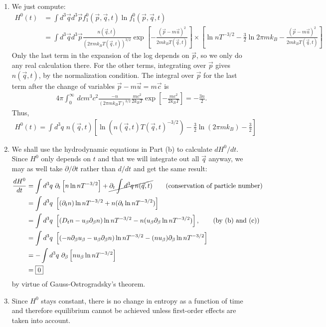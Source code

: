 \documentclass{article}
\theoremstyle{definition}
\newcommand{\p}{\partial}
\newcommand{\be}{\beta}
\newcommand{\f}[2]{\frac{#1}{#2}}
\newcommand{\lp}{\left(}
\newcommand{\rp}{\right)}
\newcommand{\lb}{\left[}
\newcommand{\rb}{\right]}
\begin{document}
\begin{enumerate}[label=(\alph*)]
	
	\item  We just compute:
	\begin{align*}
	H^0(t) 
	&= \int d^3\vec{q} d^3\vec{p} f_1^0 (\vec{p},\vec{q},t) \ln  f_1^0 (\vec{p},\vec{q},t) \\
	&= \int d^3\vec{q} d^3\vec{p} \f{n(\vec{q},t)}{(2\pi m k_BT (\vec{q},t))^{3/2}} \exp\lb -\f{(\vec{p} - m\vec{u})^2}{2mk_BT(\vec{q},t)} \rb\times\lb \ln nT^{-3/2}-\f{3}{2}\ln 2\pi m k_B - \f{(\vec{p} - m\vec{u})^2}{2mk_B T(\vec{q},t)}\rb
	\end{align*}
	Only the last term in the expansion of the log depends on $\vec{p}$, so we only do any real calculation there. For the other terms, integrating over $\vec{p}$ gives $n(\vec{q},t)$, by the normalization condition. The integral over $\vec{p}$ for the last term after the change of variables $\vec{p} - m\vec{u} = m\vec{c}$ is 
	\begin{align*}
	4\pi \int_0^\infty \,dc m^3 c^2\f{-n}{(2\pi m k_BT)^{3/2}} \f{mc^2}{2k_B T} \exp\lb -\f{mc^2}{2k_BT} \rb = 	-\f{3n}{2}.
	\end{align*}
	Thus,
	\begin{align*}
	\boxed{H^0(t) = \int d^3q \,\,n(\vec{q},t) \lb \ln \lp n(\vec{q},t)T(\vec{q},t)^{-3/2} \rp - \f{3}{2}\ln(2\pi m k_B)   - \f{3}{2} \rb}
	\end{align*}
	
	\item We shall use the hydrodynamic equations in Part (b) to calculate $dH^0/dt$. Since $H^0$ only depends on $t$ and that we will integrate out all $\vec{q}$ anyway, we may as well take $\p/\p t$ rather than $d/dt$ and get the same result:
	\begin{align*}
	\f{dH^0}{dt}
	&= \int d^3 q \,\, \p_t  \lb n\ln nT^{-3/2}\rb + \cancel{\p_t \int d^3 q\, n(\vec{q},t)} \quad\quad\text{(conservation of particle number)} \\
	&= \int d^3 q \,\, \lb (\p_t n)\ln nT^{-3/2} + n( \p_t \ln n T^{-3/2} )\rb \\
	&= \int d^3 q \,\, \lb (D_t n - u_\be \p_\be n ) \ln nT^{-3/2} - n ( u_\be \p_\be \ln nT^{-3/2}) \rb, \quad\quad \text{(by (b) and (c))} \\
	&= \int d^3 q \,\, \lb (-n\p_\be u_\be - u_\be \p_\be n ) \ln nT^{-3/2} - (n u_\be) \p_\be \ln nT^{-3/2} \rb \\
	&= -\int d^3 q \,\, \p_\be \lb n u_\be \ln n T^{-3/2} \rb \\
	&= \boxed{0}
	\end{align*}
	by virtue of Gauss-Ostrogradsky's theorem.
	
	
	\item Since $H^0$ stays constant, there is no change in entropy as a function of time and therefore equilibrium cannot be achieved unless first-order effects are taken into account. 
	
	
	
	
	
	
	
\end{enumerate}
\end{document}
